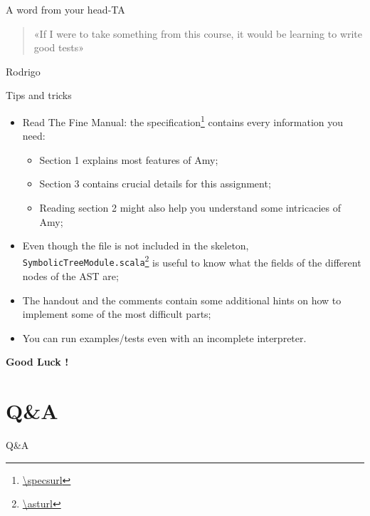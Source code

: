 \documentclass{beamer}
\begin{document}
    \begin{frame}{A word from your head-TA}
        \begin{quote}
            «If I were to take something from this course, it would be learning to write good tests»
        \end{quote}
        {\begin{flushright} \footnotesize Rodrigo \end{flushright}}
    \end{frame}


    \begin{frame}{Tips and tricks}
        \begin{itemize}
            \item Read The Fine Manual: 
            the specification\footnote{\url{\specsurl}} contains every information you need:
            \begin{itemize}
                \item Section 1 explains most features of Amy;
                \item Section 3 contains crucial details for this assignment;
                \item Reading section 2 might also help you understand some intricacies of Amy;
            \end{itemize}

            \item Even though the file is not included in the skeleton, 
            {\footnotesize\texttt{SymbolicTreeModule.scala}}\footnote{\url{\asturl}} 
            is useful to know what the fields
            of the different nodes of the AST are;

            \item The handout and the comments contain some additional hints on how to implement
            some of the most difficult parts;

            \item You can run examples/tests even with an incomplete interpreter.
        \end{itemize}

    \end{frame}

    \begin{frame}[plain]{}
        \centering \Large \bfseries
        Good Luck !
    \end{frame}

    \section{Q\&A}

    \begin{frame}{Q\&A}
        \begin{qaalist}
        \end{qaalist}
    \end{frame}
\end{document}
